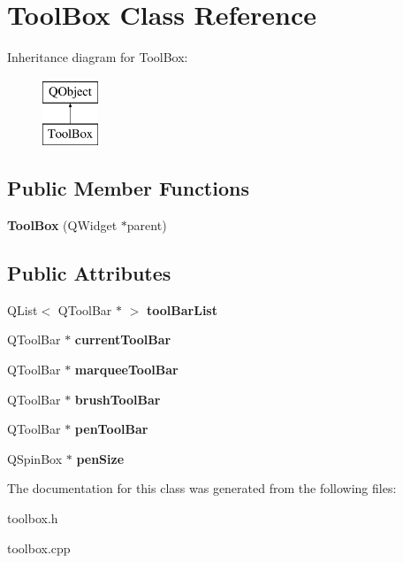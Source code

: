 \hypertarget{class_tool_box}{\section{Tool\-Box Class Reference}
\label{class_tool_box}
}
Inheritance diagram for Tool\-Box\-:\begin{figure}[H]
\begin{center}
\leavevmode
\includegraphics[height=2.000000cm]{class_tool_box}
\end{center}
\end{figure}
\subsection*{Public Member Functions}
\begin{DoxyCompactItemize}
\item 
\hypertarget{class_tool_box_a7849f505611d7b236c2e3cd548fd8a16}{{\bfseries Tool\-Box} (Q\-Widget $\ast$parent)}\label{class_tool_box_a7849f505611d7b236c2e3cd548fd8a16}

\end{DoxyCompactItemize}
\subsection*{Public Attributes}
\begin{DoxyCompactItemize}
\item 
\hypertarget{class_tool_box_a7490ce2cf614dc111418017c693fa2b6}{Q\-List$<$ Q\-Tool\-Bar $\ast$ $>$ {\bfseries tool\-Bar\-List}}\label{class_tool_box_a7490ce2cf614dc111418017c693fa2b6}

\item 
\hypertarget{class_tool_box_a188312362e14384284a1afcbe9248b05}{Q\-Tool\-Bar $\ast$ {\bfseries current\-Tool\-Bar}}\label{class_tool_box_a188312362e14384284a1afcbe9248b05}

\item 
\hypertarget{class_tool_box_af98b33face328ff6577748bdc1fda5de}{Q\-Tool\-Bar $\ast$ {\bfseries marquee\-Tool\-Bar}}\label{class_tool_box_af98b33face328ff6577748bdc1fda5de}

\item 
\hypertarget{class_tool_box_a8b2c3b4f8a7af99c0e0a1780e7edc03a}{Q\-Tool\-Bar $\ast$ {\bfseries brush\-Tool\-Bar}}\label{class_tool_box_a8b2c3b4f8a7af99c0e0a1780e7edc03a}

\item 
\hypertarget{class_tool_box_ae06fd23deb77253946ded679850071a9}{Q\-Tool\-Bar $\ast$ {\bfseries pen\-Tool\-Bar}}\label{class_tool_box_ae06fd23deb77253946ded679850071a9}

\item 
\hypertarget{class_tool_box_a6de2469d94a1598bb97c754937e133e7}{Q\-Spin\-Box $\ast$ {\bfseries pen\-Size}}\label{class_tool_box_a6de2469d94a1598bb97c754937e133e7}

\end{DoxyCompactItemize}


The documentation for this class was generated from the following files\-:\begin{DoxyCompactItemize}
\item 
toolbox.\-h\item 
toolbox.\-cpp\end{DoxyCompactItemize}
